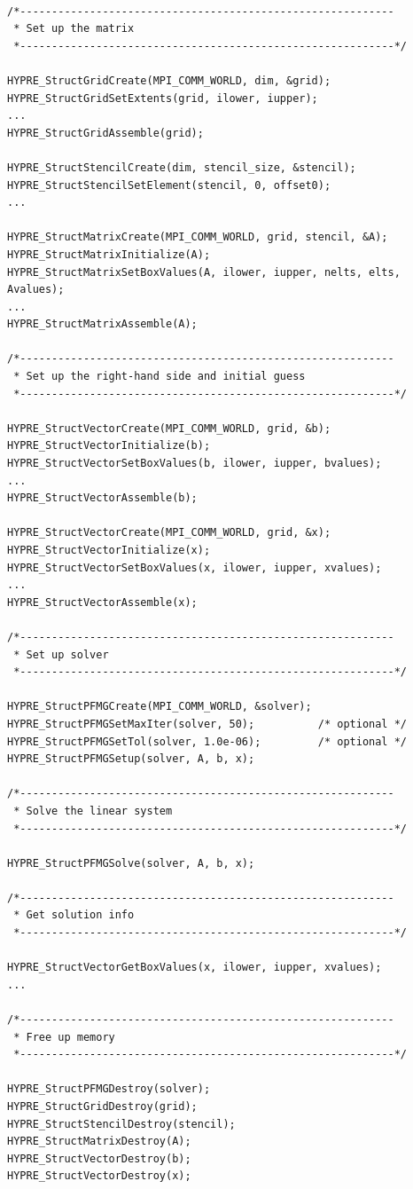 \begin{display}
\begin{verbatim}

/*-----------------------------------------------------------
 * Set up the matrix
 *-----------------------------------------------------------*/

HYPRE_StructGridCreate(MPI_COMM_WORLD, dim, &grid);
HYPRE_StructGridSetExtents(grid, ilower, iupper);
...
HYPRE_StructGridAssemble(grid);
	
HYPRE_StructStencilCreate(dim, stencil_size, &stencil);
HYPRE_StructStencilSetElement(stencil, 0, offset0);
...

HYPRE_StructMatrixCreate(MPI_COMM_WORLD, grid, stencil, &A);
HYPRE_StructMatrixInitialize(A);
HYPRE_StructMatrixSetBoxValues(A, ilower, iupper, nelts, elts, Avalues);
...
HYPRE_StructMatrixAssemble(A);

/*-----------------------------------------------------------
 * Set up the right-hand side and initial guess
 *-----------------------------------------------------------*/

HYPRE_StructVectorCreate(MPI_COMM_WORLD, grid, &b);
HYPRE_StructVectorInitialize(b);
HYPRE_StructVectorSetBoxValues(b, ilower, iupper, bvalues);
...
HYPRE_StructVectorAssemble(b);

HYPRE_StructVectorCreate(MPI_COMM_WORLD, grid, &x);
HYPRE_StructVectorInitialize(x);
HYPRE_StructVectorSetBoxValues(x, ilower, iupper, xvalues);
...
HYPRE_StructVectorAssemble(x);

/*-----------------------------------------------------------
 * Set up solver
 *-----------------------------------------------------------*/

HYPRE_StructPFMGCreate(MPI_COMM_WORLD, &solver);
HYPRE_StructPFMGSetMaxIter(solver, 50);     	 /* optional */
HYPRE_StructPFMGSetTol(solver, 1.0e-06);    	 /* optional */
HYPRE_StructPFMGSetup(solver, A, b, x);

/*-----------------------------------------------------------
 * Solve the linear system
 *-----------------------------------------------------------*/

HYPRE_StructPFMGSolve(solver, A, b, x);

/*-----------------------------------------------------------
 * Get solution info
 *-----------------------------------------------------------*/

HYPRE_StructVectorGetBoxValues(x, ilower, iupper, xvalues);
...

/*-----------------------------------------------------------
 * Free up memory
 *-----------------------------------------------------------*/

HYPRE_StructPFMGDestroy(solver);
HYPRE_StructGridDestroy(grid);
HYPRE_StructStencilDestroy(stencil);
HYPRE_StructMatrixDestroy(A);
HYPRE_StructVectorDestroy(b);
HYPRE_StructVectorDestroy(x);

\end{verbatim}
\end{display}

